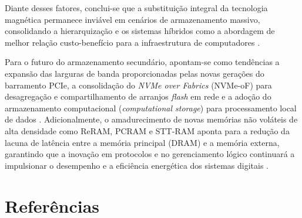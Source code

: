 \documentclass[12pt]{article}
\begin{document}
Diante desses fatores, conclui-se que a substituição integral da tecnologia magnética permanece inviável em cenários de armazenamento massivo, consolidando a hierarquização e os sistemas híbridos como a abordagem de melhor relação custo-benefício para a infraestrutura de computadores \cite{santos2014, silva2025}. 

Para o futuro do armazenamento secundário, apontam-se como tendências a expansão das larguras de banda proporcionadas pelas novas gerações do barramento PCIe, a consolidação do \textit{NVMe over Fabrics} (NVMe-oF) para desagregação e compartilhamento de arranjos \textit{flash} em rede e a adoção do armazenamento computacional (\textit{computational storage}) para processamento local de dados \cite{george2023}. Adicionalmente, o amadurecimento de novas memórias não voláteis de alta densidade como ReRAM, PCRAM e STT-RAM aponta para a redução da lacuna de latência entre a memória principal (DRAM) e a memória externa, garantindo que a inovação em protocolos e no gerenciamento lógico continuará a impulsionar o desempenho e a eficiência energética dos sistemas digitais \cite{stallings2017}.

\section{Referências}




\end{document}
